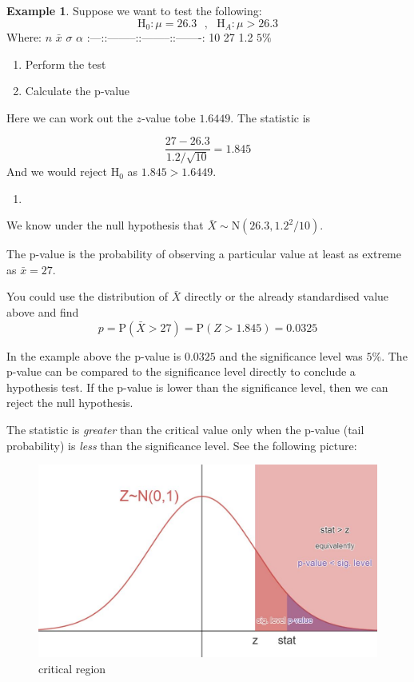 \documentclass[
]{book}
\theoremstyle{definition}
\theoremstyle{definition}
\newtheorem{example}{Example}[chapter]
\theoremstyle{definition}
\theoremstyle{definition}
\theoremstyle{remark}
\begin{document}
\begin{example}
Suppose we want to test the following:
\[\text{H}_0:\mu = 26.3 \ \ \ , \ \ \ \text{H}_A: \mu >26.3\]
Where:
\textbar{} \(n\) \textbar{} \(\bar{x}\)\textbar{} \(\sigma\) \textbar{} \(\alpha\)\textbar{}
\textbar:---:\textbar:--------:\textbar:--------:\textbar:-------:\textbar{}
\textbar{} 10 \textbar{} 27 \textbar{} 1.2 \textbar{} \(5\%\) \textbar{}

\begin{enumerate}
\def\labelenumi{\alph{enumi})}
\item
  Perform the test
\item
  Calculate the p-value
\end{enumerate}

Here we can work out the \(z\)-value tobe \(1.6449\). The statistic is

\[\frac{27 - 26.3}{1.2/\sqrt{10}} = 1.845\]
And we would reject \(\text{H}_0\) as \(1.845 > 1.6449\).

\begin{enumerate}
\def\labelenumi{\alph{enumi})}
\setcounter{enumi}{1}
\item
\end{enumerate}

We know under the null hypothesis that \(\bar{X} \sim \text{N}(26.3, 1.2^2/10)\).

The p-value is the probability of observing a particular value at least as extreme as \(\bar{x}=27\).

You could use the distribution of \(\bar{X}\) directly or the already standardised value above and find \[p = \text{P}(\bar{X} >27) = \text{P}(Z>1.845) = 0.0325 \]
\end{example}

In the example above the p-value is \(0.0325\) and the significance level was \(5\%\). The p-value can be compared to the significance level directly to conclude a hypothesis test. If the p-value is lower than the significance level, then we can reject the null hypothesis.

The statistic is \emph{greater} than the critical value only when the p-value (tail probability) is \emph{less} than the significance level. See the following picture:

\begin{figure}

{\centering \includegraphics[width=0.75\linewidth]{./figures/p-value} 

}

\caption{critical region}\label{fig:pval}
\end{figure}
\end{document}
